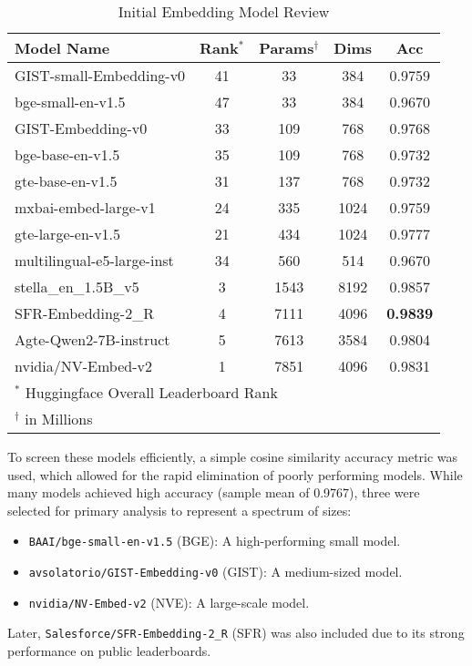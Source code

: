 \begin{table}[!tb]
    \captionsetup{skip=5pt}
    \centering
    \caption{Initial Embedding Model Review}
    \label{tbl:emb_models}
    \begin{tabular}{lcccc}
        \toprule
        Model Name                 & Rank$^{*}$ & Params$^{\dagger}$ & Dims & Acc             \\
        \midrule
        GIST-small-Embedding-v0    & 41         & 33                 & 384  & 0.9759          \\
        bge-small-en-v1.5          & 47         & 33                 & 384  & 0.9670          \\
        GIST-Embedding-v0          & 33         & 109                & 768  & 0.9768          \\
        bge-base-en-v1.5           & 35         & 109                & 768  & 0.9732          \\
        gte-base-en-v1.5           & 31         & 137                & 768  & 0.9732          \\
        mxbai-embed-large-v1       & 24         & 335                & 1024 & 0.9759          \\
        gte-large-en-v1.5          & 21         & 434                & 1024 & 0.9777          \\
        multilingual-e5-large-inst & 34         & 560                & 514  & 0.9670          \\
        stella\_en\_1.5B\_v5       & 3          & 1543               & 8192 & 0.9857          \\
        SFR-Embedding-2\_R         & 4          & 7111               & 4096 & \textbf{0.9839} \\
        Agte-Qwen2-7B-instruct     & 5          & 7613               & 3584 & 0.9804          \\
        nvidia/NV-Embed-v2         & 1          & 7851               & 4096 & 0.9831          \\
        \bottomrule
        \multicolumn{4}{p{6cm}}{\scriptsize $^{*}$ Huggingface Overall Leaderboard Rank} \\
        \multicolumn{4}{p{6cm}}{\scriptsize $^{\dagger}$ in Millions}
    \end{tabular}
\end{table}

To screen these models efficiently, a simple cosine similarity accuracy metric was used, which allowed for the rapid elimination of poorly performing models. While many models achieved high accuracy (sample mean of 0.9767), three were selected for primary analysis to represent a spectrum of sizes:
\begin{itemize}
    \item \verb|BAAI/bge-small-en-v1.5| (BGE): A high-performing small model.
    \item \verb|avsolatorio/GIST-Embedding-v0| (GIST): A medium-sized model.
    \item \verb|nvidia/NV-Embed-v2| (NVE): A large-scale model.
\end{itemize}
Later, \verb|Salesforce/SFR-Embedding-2_R| (SFR) was also included due to its strong performance on public leaderboards.

